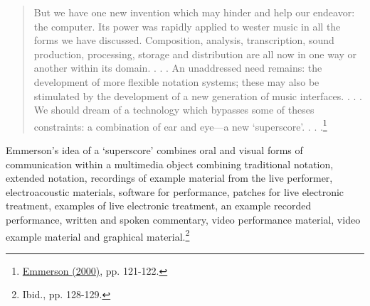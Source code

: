 \begin{quote}
But we have one new invention which may hinder and help our endeavor: the computer. Its power was rapidly applied to wester music in all the forms we have discussed. Composition, analysis, transcription, sound production, processing, storage and distribution are all now in one way or another within its domain. . . . An unaddressed need remains: the development of more flexible notation systems; these may also be stimulated by the development of a new generation of music interfaces. . . . We should dream of a technology which bypasses some of theses constraints: a combination of ear and eye---a new `superscore'. . . .\footnote{\hyperlink{emmersoncross}{Emmerson (2000)}, pp. 121-122.} 
\end{quote}
Emmerson's idea of a `superscore' combines oral and visual forms of communication within a multimedia object combining traditional notation, extended notation, recordings of example material from the live performer, electroacoustic materials, software for performance, patches for live electronic treatment, examples of live electronic treatment, an example recorded performance, written and spoken commentary, video performance material, video example material and graphical material.\footnote{Ibid., pp. 128-129.} 

